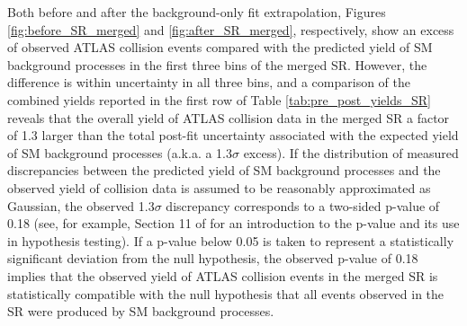 Both before and after the background-only fit extrapolation, Figures \ref{fig:before_SR_merged} and \ref{fig:after_SR_merged}, respectively, show an excess of observed ATLAS collision events compared with the predicted yield of SM background processes in the first three bins of the merged SR. However, the difference is within uncertainty in all three bins, and a comparison of the combined yields reported in the first row of Table \ref{tab:pre_post_yields_SR} reveals that the overall yield of ATLAS collision data in the merged SR a factor of 1.3 larger than the total post-fit uncertainty associated with the expected yield of SM background processes (a.k.a. a 1.3\(\sigma\) excess). If the distribution of measured discrepancies between the predicted yield of SM background processes and the observed yield of collision data is assumed to be reasonably approximated as Gaussian, the observed 1.3\(\sigma\) discrepancy corresponds to a two-sided p-value of 0.18 (see, for example, Section 11 of \cite{Stats_2003} for an introduction to the p-value and its use in hypothesis testing). If a p-value below 0.05 is taken to represent a statistically significant deviation from the null hypothesis, the observed p-value of 0.18 implies that the observed yield of ATLAS collision events in the merged SR is statistically compatible with the null hypothesis that all events observed in the SR were produced by SM background processes. 

%

